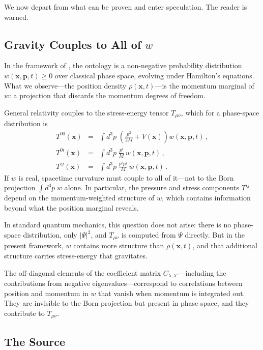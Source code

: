 \documentclass[12pt]{article}
\begin{document}
We now depart from what can be proven and enter speculation.  The reader is warned.

\subsection{Gravity Couples to All of $w$}

In the framework of \cite{macevoy2025}, the ontology is a non-negative probability distribution $w(\mathbf{x},\mathbf{p},t) \geq 0$ over classical phase space, evolving under Hamilton's equations.  What we observe---the position density $\rho(\mathbf{x},t)$---is the momentum marginal of $w$: a projection that discards the momentum degrees of freedom.

General relativity couples to the stress-energy tensor $T_{\mu\nu}$, which for a phase-space distribution is
\begin{eqnarray}
T^{00}(\mathbf{x}) &=& \int d^3p\; \left(\frac{p^2}{2M} + V(\mathbf{x})\right) w(\mathbf{x},\mathbf{p},t) \,, \\
T^{0i}(\mathbf{x}) &=& \int d^3p\; \frac{p^i}{M}\, w(\mathbf{x},\mathbf{p},t) \,, \\
T^{ij}(\mathbf{x}) &=& \int d^3p\; \frac{p^i p^j}{M}\, w(\mathbf{x},\mathbf{p},t) \,.
\end{eqnarray}
If $w$ is real, spacetime curvature must couple to all of it---not to the Born projection $\int d^3p\; w$ alone.  In particular, the pressure and stress components $T^{ij}$ depend on the momentum-weighted structure of $w$, which contains information beyond what the position marginal reveals.

In standard quantum mechanics, this question does not arise: there is no phase-space distribution, only $|\Psi|^2$, and $T_{\mu\nu}$ is computed from $\Psi$ directly.  But in the present framework, $w$ contains more structure than $\rho(\mathbf{x},t)$, and that additional structure carries stress-energy that gravitates.

The off-diagonal elements of the coefficient matrix $C_{\lambda,\lambda'}$---including the contributions from negative eigenvalues---correspond to correlations between position and momentum in $w$ that vanish when momentum is integrated out.  They are invisible to the Born projection but present in phase space, and they contribute to $T_{\mu\nu}$.

\subsection{The Source}
\end{document}
